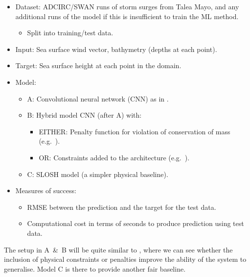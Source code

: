 \documentclass[usenames, dvipsnames]{article}      %
\begin{document}
\begin{itemize}
    \item Dataset: ADCIRC/SWAN runs of
    storm surges from Talea Mayo,
    and any additional runs of the model if this is insufficient
    to train the ML method.
    \begin{itemize}
        \item Split into training/test data.
    \end{itemize}
    \item Input: Sea surface wind vector, 
    bathymetry (depths at each point).
    \item Target: Sea surface height at each point in the domain.
    \item Model:
    \begin{itemize}
        \item A: Convolutional neural network (CNN) as in \cite{Guo2021Data-drivenNetworks}.
        \item B: Hybrid model CNN (after A) with:
        \begin{itemize}
            \item EITHER: Penalty function for violation 
                of conservation of mass (e.g.~\cite{beucler2019achieving}).
            \item OR: Constraints added to the architecture
            (e.g.~\cite{beucler2019achieving}).
        \end{itemize}
        \item C: SLOSH model (a simpler physical baseline).
    \end{itemize}

    \item Measures of success: 
    \begin{itemize}
        \item RMSE between the prediction and the target for the
        test data.
        \item Computational cost in terms of seconds to produce prediction using test data.
    \end{itemize}
\end{itemize}

The setup in A~\&~B will be quite similar to
\cite{beucler2019achieving}, where we can see
whether the inclusion of physical constraints or penalties
improve the ability of the system to generalise.
Model C is there to provide another fair baseline.
\end{document}
